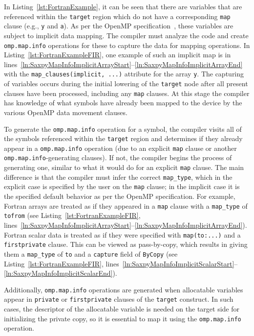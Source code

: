 \documentclass[acmtog,natbib=false]{acmart}
\newcommand{\code}[1]{\texttt{#1}\xspace}
\begin{document}
In Listing~\ref{lst:FortranExample}, it can be seen that there are variables that are referenced within the \code{target} region which do not have a corresponding \code{map} clause (e.g., \code{y} and \code{a}).
As per the OpenMP specification~\cite{OARB24}, these variables are subject to implicit data mapping.
The compiler must analyze the code and create \code{omp.map.info} operations for these to capture the data for mapping operations. 
In Listing~\ref{lst:FortranExampleFIR}, one example of such an implicit map is in lines~\ref{ln:SaxpyMapInfoImplicitArrayStart}--\ref{ln:SaxpyMapInfoImplicitArrayEnd} with the \code{map\_clauses(implicit, ...)} attribute for the array \code{y}.
The capturing of variables occurs during the initial lowering of the \code{target} node after all present clauses have been processed, including any \code{map} clauses. 
At this stage the compiler has knowledge of what symbols have already been mapped to the device by the various OpenMP data movement clauses.

To generate the \code{omp.map.info} operation for a symbol, the compiler visits all of the symbols referenced within the \code{target} region and determines if they already appear in a \code{omp.map.info} operation (due to an explicit \code{map} clause or another \code{omp.map.info}-generating clauses). 
If not, the compiler begins the process of generating one, similar to what it would do for an explicit \code{map} clause.
The main difference is that the compiler must infer the correct \code{map\_type}, which in the explicit case is specified by the user on the \code{map} clause; in the implicit case it is the specified default behavior as per the OpenMP specification.
For example, Fortran arrays are treated as if they appeared in a \code{map} clause with a \code{map\_type} of \code{tofrom} (see Listing~\ref{lst:FortranExampleFIR}, lines~\ref{ln:SaxpyMapInfoImplicitArrayStart}--\ref{ln:SaxpyMapInfoImplicitArrayEnd}).
Fortran scalar data is treated as if they were specified with \code{map(to:...)} and a \code{firstprivate} clause.
This can be viewed as pass-by-copy, which results in giving them a \code{map\_type} of \code{to} and a \code{capture} field of \code{ByCopy} (see Listing~\ref{lst:FortranExampleFIR}, lines~\ref{ln:SaxpyMapInfoImplicitScalarStart}--\ref{ln:SaxpyMapInfoImplicitScalarEnd}). 

Additionally, \code{omp.map.info} operations are generated when allocatable variables appear in \code{private} or \code{firstprivate} clauses of the \code{target} construct.
In such cases, the descriptor of the allocatable variable is needed on the target side for initializing the private copy, so it is essential to map it using the \code{omp.map.info} operation.
\end{document}
